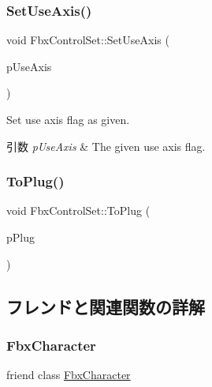 \subsubsection{\texorpdfstring{Set\+Use\+Axis()}{SetUseAxis()}}
{\footnotesize\ttfamily void Fbx\+Control\+Set\+::\+Set\+Use\+Axis (\begin{DoxyParamCaption}\item[{bool}]{p\+Use\+Axis }\end{DoxyParamCaption})}

Set use axis flag as given. 
\begin{DoxyParams}{引数}
{\em p\+Use\+Axis} & The given use axis flag. \\
\hline
\end{DoxyParams}
\mbox{\label{class_fbx_control_set_aa498d71226be996497662a04f2f3f68d}} 
\subsubsection{\texorpdfstring{To\+Plug()}{ToPlug()}}
{\footnotesize\ttfamily void Fbx\+Control\+Set\+::\+To\+Plug (\begin{DoxyParamCaption}\item[{\hyperlink{class_fbx_control_set_plug}{Fbx\+Control\+Set\+Plug} $\ast$}]{p\+Plug }\end{DoxyParamCaption})}



\subsection{フレンドと関連関数の詳解}
\mbox{\label{class_fbx_control_set_abcc889edc85f236c5ab060bb37663168}} 
\subsubsection{\texorpdfstring{Fbx\+Character}{FbxCharacter}}
{\footnotesize\ttfamily friend class \hyperlink{class_fbx_character}{Fbx\+Character}\hspace{0.3cm}{\ttfamily [friend]}}




